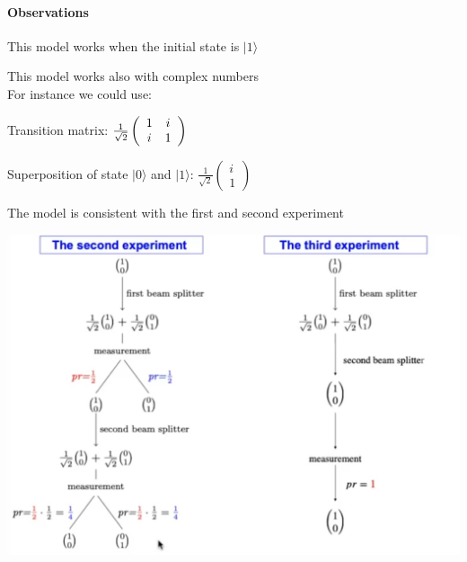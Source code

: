 \documentclass[10pt]{report}
\begin{document}
\paragraph{Observations}\begin{list}{}{}
	\item This model works when the initial state is $|1\rangle$
	\item This model works also with complex numbers\\
	For instance we could use:
	\begin{list}{}{}
		\item Transition matrix: $\frac{1}{\sqrt{2}}\left(\begin{array}{c c}
		1&i\\i&1
		\end{array}\right)$
		\item Superposition of state $|0\rangle$ and $|1\rangle$: $\frac{1}{\sqrt{2}}\left(\begin{array}{c}
		i\\1
		\end{array}\right)$
		\item The model is consistent with the first and second experiment
		\begin{center}
			\includegraphics[scale=0.5]{4.png}
		\end{center}
	\end{list}
\end{list}
\end{document}
